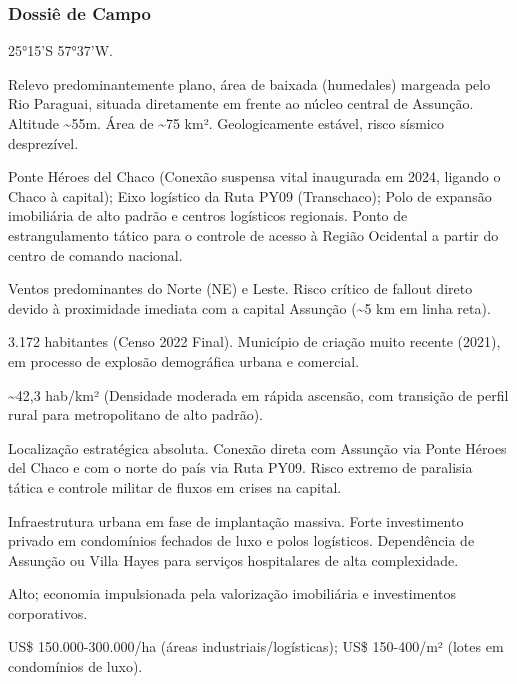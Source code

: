 \subsubsection{Dossiê de Campo}
\begin{description}[style=nextline,leftmargin=0.5cm,font=\bfseries]
\item[Coordenadas]  25°15'S 57°37'W.
\item[Topografia]  Relevo predominantemente plano, área de baixada (humedales) margeada pelo Rio Paraguai, situada diretamente em frente ao núcleo central de Assunção. Altitude \textasciitilde 55m. Área de \textasciitilde 75 km². Geologicamente estável, risco sísmico desprezível.
\item[Alvos Estratégicos]  Ponte Héroes del Chaco (Conexão suspensa vital inaugurada em 2024, ligando o Chaco à capital); Eixo logístico da Ruta PY09 (Transchaco); Polo de expansão imobiliária de alto padrão e centros logísticos regionais. Ponto de estrangulamento tático para o controle de acesso à Região Ocidental a partir do centro de comando nacional.
\item[Fallout]  Ventos predominantes do Norte (NE) e Leste. Risco crítico de fallout direto devido à proximidade imediata com a capital Assunção (\textasciitilde 5 km em linha reta).
\item[População]  3.172 habitantes (Censo 2022 Final). Município de criação muito recente (2021), em processo de explosão demográfica urbana e comercial.
\item[Densidade]  \textasciitilde 42,3 hab/\allowbreak \allowbreak km² (Densidade moderada em rápida ascensão, com transição de perfil rural para metropolitano de alto padrão).
\item[Vias de Acesso]  Localização estratégica absoluta. Conexão direta com Assunção via Ponte Héroes del Chaco e com o norte do país via Ruta PY09. Risco extremo de paralisia tática e controle militar de fluxos em crises na capital.
\item[Serviços]  Infraestrutura urbana em fase de implantação massiva. Forte investimento privado em condomínios fechados de luxo e polos logísticos. Dependência de Assunção ou Villa Hayes para serviços hospitalares de alta complexidade.
\item[Custo de Vida]  Alto; economia impulsionada pela valorização imobiliária e investimentos corporativos.
\item[Preço da Terra]  US\$ 150.000-300.000/\allowbreak \allowbreak ha (áreas industriais/\allowbreak \allowbreak logísticas); US\$ 150-400/\allowbreak \allowbreak m² (lotes em condomínios de luxo).

\end{description}
